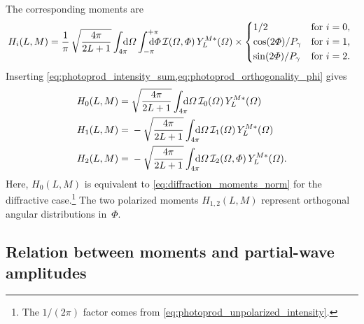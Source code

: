 The corresponding moments are
\begin{equation}
  \label{eq:photoprod_moments_norm}
  H_i(L, M)
  = \frac{1}{\pi}\, \sqrt{\frac{4 \pi}{2 L + 1}}
  \int_{4 \pi}\!\!\!\! \dif{\Omega} \int_{-\pi}^{+\pi}\hspace{-1.2em} \dif{\Phi}\,
  \intensity(\Omega, \Phi)\, Y_L^{M *}(\Omega) \times \begin{cases*}
    1 / 2                   & for $i = 0$, \\
    \cos(2 \Phi) / P_\gamma & for $i = 1$, \\
    \sin(2 \Phi) / P_\gamma & for $i = 2$.
  \end{cases*}
\end{equation}
Inserting
\cref{eq:photoprod_intensity_sum,eq:photoprod_orthogonality_phi} gives
\begin{align}
  \label{eq:photoprod_moments_norm_H0}
  H_0(L, M)
  ={}& \sqrt{\frac{4 \pi}{2 L + 1}} \int_{4 \pi}\!\!\!\! \dif{\Omega}\,
  \intensity_0(\Omega)\, Y_L^{M *}(\Omega)
  \\
  \label{eq:photoprod_moments_norm_H1}
  H_1(L, M)
  ={}& -\sqrt{\frac{4 \pi}{2 L + 1}} \int_{4 \pi}\!\!\!\! \dif{\Omega}\,
  \intensity_1(\Omega)\, Y_L^{M *}(\Omega)
  \\
  \label{eq:photoprod_moments_norm_H2}
  H_2(L, M)
  ={}& -\sqrt{\frac{4 \pi}{2 L + 1}} \int_{4 \pi}\!\!\!\! \dif{\Omega}\,
  \intensity_2(\Omega, \Phi)\, Y_L^{M *}(\Omega).
\end{align}
Here, $H_0(L, M)$ is equivalent to \cref{eq:diffraction_moments_norm}
for the diffractive case.\footnote{The $1 / (2 \pi)$ factor comes from
\cref{eq:photoprod_unpolarized_intensity}.}  The two polarized moments
$H_{1, 2}(L, M)$ represent orthogonal angular distributions in~$\Phi$.


\subsection{Relation between moments and partial-wave amplitudes}%
\label{sec:photoprod:moments_pw}

